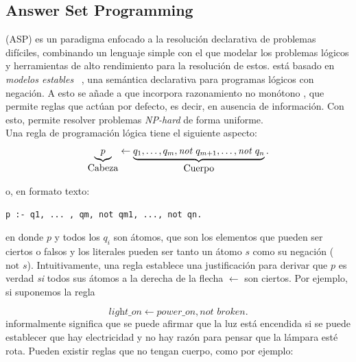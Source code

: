 \subsection{Answer Set Programming}\label{subsec:asp}

\asp (ASP) es un paradigma enfocado a la resolución declarativa de problemas difíciles, combinando un lenguaje simple con el que modelar los problemas lógicos y herramientas de alto rendimiento para la resolución de estos. \asp está basado en \emph{modelos estables}~ \cite{stablemodels}, una semántica declarativa para programas lógicos con negación. A esto se añade a que incorpora razonamiento no monótono \cite{nonmonotonic}, que permite reglas que actúan por defecto, es decir, en ausencia de información. Con esto, \asp permite resolver problemas \textit{NP-hard} de forma uniforme. \\

Una regla de programación lógica tiene el siguiente aspecto:
\begin{equation}
	\underbrace{p}_{\text{\normalsize Cabeza}} \leftarrow \underbrace{q_1, \dotsc, q_m , \textit{not } q_{m+1} ,\dotsc, \textit{not } q_n}_{\text{\normalsize Cuerpo}}.
\end{equation}

\hspace{1em}
\noindent o, en formato texto:

\begin{lstlisting}[label=lst:qreached]
      p :- q1, ... , qm, not qm1, ..., not qn.
\end{lstlisting}
en donde $p$ y todos los $q_i$ son átomos, que son los elementos que pueden ser ciertos o falsos y los literales pueden ser tanto un átomo $s$ como su negación ($\text{not } s$). Intuitivamente, una regla establece una justificación para derivar que $p$ es verdad \textit{si} todos sus átomos a la derecha de la flecha $\leftarrow$ son ciertos. Por ejemplo, si suponemos la regla

\begin{equation}\label{eq:light}
	\textit{light\_on} \leftarrow \textit{power\_on}, \textit{not } broken.
\end{equation}
informalmente significa que se puede afirmar que la luz está encendida si se puede establecer que hay electricidad y no hay razón para pensar que la lámpara esté rota. Pueden existir reglas que no tengan cuerpo,  como por ejemplo:

